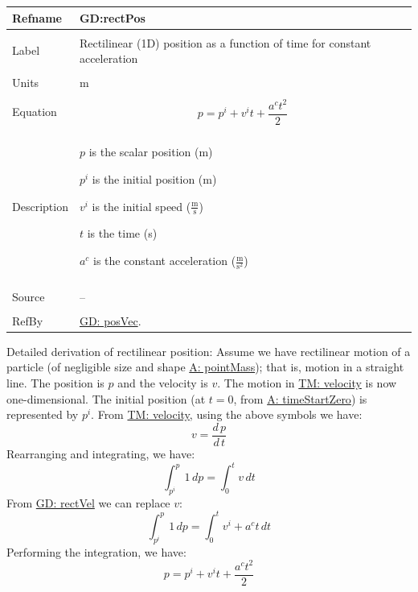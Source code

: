 \documentclass[12pt]{article}
\begin{document}
\noindent \begin{minipage}{\textwidth}
\begin{tabular}{p{} p{}}
\toprule \textbf{Refname} & \textbf{GD:rectPos}
\label{GD:rectPos}
\\ \midrule \\
Label & Rectilinear (1D) position as a function of time for constant acceleration
\\ \midrule \\
Units & m
\\ \midrule \\
Equation & \begin{displaymath}
           p={p^{i}}+{v^{i}} t+\frac{{a^{c}} t^{2}}{2}
           \end{displaymath}
\\ \midrule \\
Description & \begin{symbDescription}
              \item{$p$ is the scalar position (m)}
              \item{${p^{i}}$ is the initial position (m)}
              \item{${v^{i}}$ is the initial speed ($\frac{\text{m}}{\text{s}}$)}
              \item{$t$ is the time (s)}
              \item{${a^{c}}$ is the constant acceleration ($\frac{\text{m}}{\text{s}^{2}}$)}
              \end{symbDescription}
\\ \midrule \\
Source & --
\\ \midrule \\
RefBy & \hyperref[GD:posVec]{GD: posVec}.
\\ \bottomrule \end{tabular}
\end{minipage}
Detailed derivation of rectilinear position:
Assume we have rectilinear motion of a particle (of negligible size and shape \hyperref[pointMass]{A: pointMass}); that is, motion in a straight line. The position is $p$ and the velocity is $v$. The motion in \hyperref[TM:velocity]{TM: velocity} is now one-dimensional. The initial position (at $t=0$, from \hyperref[timeStartZero]{A: timeStartZero}) is represented by ${p^{i}}$. From \hyperref[TM:velocity]{TM: velocity}, using the above symbols we have:
\begin{displaymath}
v=\frac{d\,p}{d\,t}
\end{displaymath}
Rearranging and integrating, we have:
\begin{displaymath}
\int_{{p^{i}}}^{p}{1}\,dp=\int_{0}^{t}{v}\,dt
\end{displaymath}
From \hyperref[GD:rectVel]{GD: rectVel} we can replace $v$:
\begin{displaymath}
\int_{{p^{i}}}^{p}{1}\,dp=\int_{0}^{t}{{v^{i}}+{a^{c}} t}\,dt
\end{displaymath}
Performing the integration, we have:
\begin{displaymath}
p={p^{i}}+{v^{i}} t+\frac{{a^{c}} t^{2}}{2}
\end{displaymath}
\par~
\end{document}
